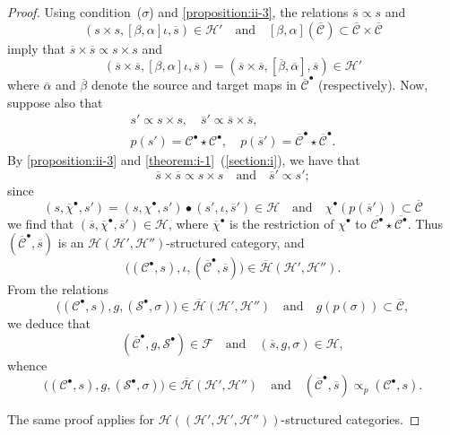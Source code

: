 \documentclass[a4paper,fleqn]{article}
\theoremstyle{plain}
\theoremstyle{definition}
\newcommand{\textand}{\quad\text{and}\quad}
\newcommand{\CC}{\mathcal{C}}
\newcommand{\HH}{\mathcal{H}}
\renewcommand{\SS}{\mathcal{S}}
\newcommand{\FF}{\mathcal{F}}
\newcommand{\subs}{\mathrel{\propto}}
\begin{document}
\begin{proof}
  Using condition~($\sigma$) and \cref{proposition:ii-3}, the relations $\overline{s}\subs s$ and
  \[
    (s\times s,[\beta,\alpha]\iota,\overline{s})\in\HH'
    \textand
    [\beta,\alpha](\overline{\CC})\subset\overline{\CC}\times\overline{\CC}
  \]
  imply that $\overline{s}\times\overline{s}\subs s\times s$ and
  \[
    (\overline{s}\times\overline{s},[\beta,\alpha]\iota,\overline{s})
    = (\overline{s}\times\overline{s},[\overline{\beta},\overline{\alpha}],\overline{s})
    \in\HH'
  \]
  where $\overline{\alpha}$ and $\overline{\beta}$ denote the source and target maps in $\overline{\CC}^\bullet$ (respectively).
  Now, suppose also that
  \[
    \begin{gathered}
      s'\subs s\times s,
      \quad
      \overline{s}'\subs\overline{s}\times\overline{s},
    \\p(s')=\CC^\bullet\star\CC^\bullet,
      \quad
      p(\overline{s}')=\overline{\CC}^\bullet\star\overline{\CC}^\bullet.
    \end{gathered}
  \]
  By \cref{proposition:ii-3} and \cref{theorem:i-1}~(\cref{section:i}), we have that
  \[
    \overline{s}\times\overline{s}\subs s\times s
    \textand
    \overline{s}'\subs s';
  \]
  since
  \[
    (s,\overline{\chi}^\bullet,s')
    = (s,\chi^\bullet,s')\bullet(s',\iota,\overline{s}')
    \in\HH
    \textand
    \chi^\bullet(p(\overline{s}'))
    \subset\overline{\CC}
  \]
  we find that $(\overline{s},\overline{\chi}^\bullet,\overline{s}')\in\HH$, where $\overline{\chi}^\bullet$ is the restriction of $\chi^\bullet$ to $\overline{\CC^\bullet}\star\overline{\CC^\bullet}$.
  Thus $(\overline{\CC}^\bullet,\overline{s})$ is an $\HH(\HH',\HH'')$-structured category, and
  \[
    \big(
      (\CC^\bullet,s),
      \iota,
      (\overline{\CC}^\bullet,\overline{s})
    \big)
    \in\overline{\HH}(\HH',\HH'').
  \]
  From the relations
  \[
    \big(
      (\CC^\bullet,s),
      g,
      (\SS^\bullet,\sigma)
    \big)
    \in\overline{\HH}(\HH',\HH'')
    \textand
    g(p(\sigma))
    \subset\overline{\CC},
  \]
  we deduce that
  \[
    (\overline{\CC}^\bullet,g,\SS^\bullet)\in\FF
    \textand
    (\overline{s},g,\sigma)\in\HH,
  \]
  whence
  \[
    \big(
      (\CC^\bullet,s),
      g,
      (\SS^\bullet,\sigma)
    \big)
    \in\overline{\HH}(\HH',\HH'')
    \textand
    (\overline{\CC}^\bullet,\overline{s})
    \subs_{\overline{p}} (\CC^\bullet,s).
  \]

  The same proof applies for $\HH((\HH',\HH',\HH''))$-structured categories.
\end{proof}
\end{document}
